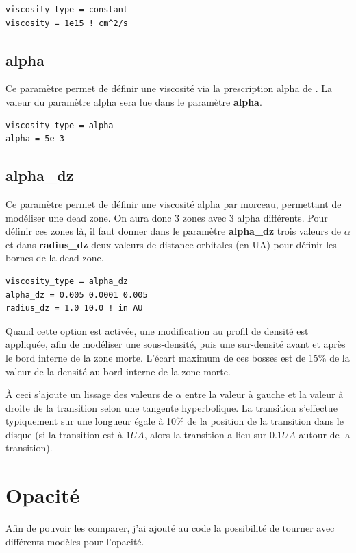 \begin{verbatim}
viscosity_type = constant
viscosity = 1e15 ! cm^2/s
\end{verbatim}

\subsection{alpha}
Ce paramètre permet de définir une viscosité via la prescription alpha de \cite{shakura1973black}. La valeur du paramètre alpha sera lue dans le paramètre \textbf{alpha}. 

\begin{verbatim}
viscosity_type = alpha
alpha = 5e-3
\end{verbatim}

\subsection{alpha\_dz}\label{sec:dead_zone}
Ce paramètre permet de définir une viscosité alpha par morceau, permettant de modéliser une dead zone. On aura donc 3 zones avec 3 alpha différents. Pour définir ces zones là, il faut donner dans le paramètre \textbf{alpha\_dz} trois valeurs de $\alpha$ et dans \textbf{radius\_dz} deux valeurs de distance orbitales (en \unit{UA}) pour définir les bornes de la dead zone.
\begin{verbatim}
viscosity_type = alpha_dz
alpha_dz = 0.005 0.0001 0.005
radius_dz = 1.0 10.0 ! in AU
\end{verbatim}

Quand cette option est activée, une modification au profil de densité est appliquée, afin de modéliser une sous-densité, puis une sur-densité avant et après le bord interne de la zone morte. L'écart maximum de ces bosses est de 15\% de la valeur de la densité au bord interne de la zone morte. 

À ceci s'ajoute un lissage des valeurs de $\alpha$ entre la valeur à gauche et la valeur à droite de la transition selon une tangente hyperbolique. La transition s'effectue typiquement sur une longueur égale à 10\% de la position de la transition dans le disque (si la transition est à $1\unit{UA}$, alors la transition a lieu sur $0.1\unit{UA}$ autour de la transition).

\section{Opacité}
Afin de pouvoir les comparer, j'ai ajouté au code la possibilité de tourner avec différents modèles pour l'opacité. 

